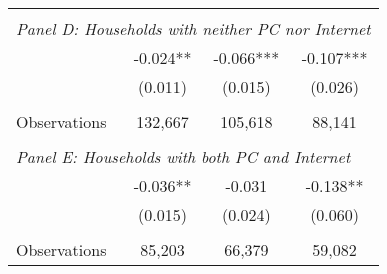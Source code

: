 {\begin{tabular}{lccc}
&  &  &   \\
\multicolumn{4}{l}{\textit{Panel D: Households with neither PC nor Internet}} \\
\hspace{3mm}        &      -0.024** &      -0.066***&      -0.107***\\
                    &     (0.011)   &     (0.015)   &     (0.026)   \\
                    &               &               &               \\
\hspace{3mm}Observations&     132,667   &     105,618   &      88,141   \\
 
&  &  &   \\
\multicolumn{4}{l}{\textit{Panel E: Households with both PC and Internet}} \\
\hspace{3mm}        &      -0.036** &      -0.031   &      -0.138** \\
                    &     (0.015)   &     (0.024)   &     (0.060)   \\
                    &               &               &               \\
\hspace{3mm}Observations&      85,203   &      66,379   &      59,082   \\
 

\bottomrule
\end{tabular}
}
